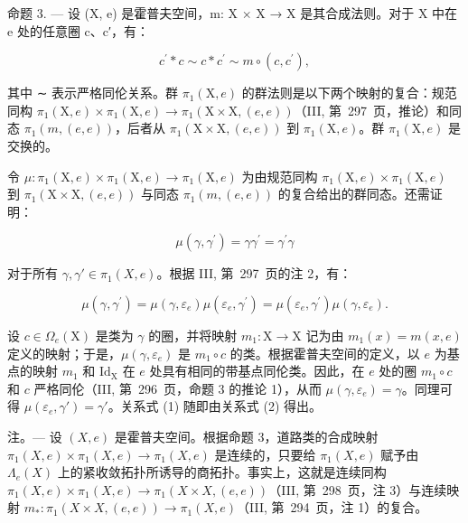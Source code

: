 命题 3. — 设 (X, e) 是霍普夫空间，m: X × X → X 是其合成法则。对于 X 中在 e 处的任意圈 c、c′，有：

\[
c ^ {\prime} * c \sim c * c ^ {\prime} \sim m \circ (c, c ^ {\prime}),
\]

其中 ∼ 表示严格同伦关系。群 \(\pi_{1}(\mathrm{X},e)\) 的群法则是以下两个映射的复合：规范同构 \(\pi_{1}(\mathrm{X},e)\times\pi_{1}(\mathrm{X},e)\to\pi_{1}(\mathrm{X}\times\mathrm{X},(e,e))\)（III, 第~297~页，推论）和同态 \(\pi_{1}(m,(e,e))\)，后者从 \(\pi_{1}(\mathrm{X}\times\mathrm{X},(e,e))\) 到 \(\pi_{1}(\mathrm{X},e)\)。群 \(\pi_{1}(\mathrm{X},e)\) 是交换的。

令 \(\mu\colon\pi_{1}(\mathrm{X},e)\times\pi_{1}(\mathrm{X},e)\to\pi_{1}(\mathrm{X},e)\) 为由规范同构 \(\pi_{1}(\mathrm{X},e)\times\pi_{1}(\mathrm{X},e)\) 到 \(\pi_{1}(\mathrm{X}\times\mathrm{X},(e,e))\) 与同态 \(\pi_{1}(m,(e,e))\) 的复合给出的群同态。还需证明：

\[
\mu (\gamma , \gamma^ {\prime}) = \gamma \gamma^ {\prime} = \gamma^ {\prime} \gamma\tag{1}
\]

对于所有 \(\gamma, \gamma' \in \pi_1(X, e)\)。根据 III, 第~297~页的注 2，有：

\[
\mu (\gamma , \gamma^ {\prime}) = \mu (\gamma , \varepsilon_ {e}) \mu (\varepsilon_ {e}, \gamma^ {\prime}) = \mu (\varepsilon_ {e}, \gamma^ {\prime}) \mu (\gamma , \varepsilon_ {e}).\tag{2}
\]

设 \(c \in \Omega_e(\mathrm{X})\) 是类为 \(\gamma\) 的圈，并将映射 \(m_1 \colon \mathrm{X} \to \mathrm{X}\) 记为由 \(m_1(x) = m(x, e)\) 定义的映射；于是，\(\mu(\gamma, \varepsilon_e)\) 是 \(m_1 \circ c\) 的类。根据霍普夫空间的定义，以 \(e\) 为基点的映射 \(m_1\) 和 \(\mathrm{Id_X}\) 在 \(e\) 处具有相同的带基点同伦类。因此，在 \(e\) 处的圈 \(m_1 \circ c\) 和 \(c\) 严格同伦（III, 第~296~页，命题 3 的推论 1），从而 \(\mu(\gamma, \varepsilon_e) = \gamma\)。同理可得 \(\mu(\varepsilon_e, \gamma') = \gamma'\)。关系式 (1) 随即由关系式 (2) 得出。

注。--- 设 \((X,e)\) 是霍普夫空间。根据命题 3，道路类的合成映射 \(\pi_{1}(X,e)\times\pi_{1}(X,e)\to\pi_{1}(X,e)\) 是连续的，只要给 \(\pi_{1}(X,e)\) 赋予由 \(\Lambda_{e}(X)\) 上的紧收敛拓扑所诱导的商拓扑。事实上，这就是连续同构 \(\pi_{1}(X,e)\times\pi_{1}(X,e)\to\pi_{1}(X\times X,(e,e))\)（III, 第~298~页，注 3）与连续映射 \(m_{*}:\pi_{1}(X\times X,(e,e))\to\pi_{1}(X,e)\)（III, 第~294~页，注 1）的复合。

